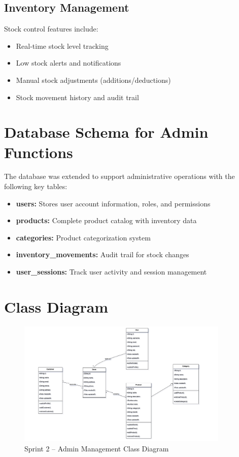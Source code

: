 \subsection*{Inventory Management}

Stock control features include:
\begin{itemize}
  \item Real-time stock level tracking
  \item Low stock alerts and notifications
  \item Manual stock adjustments (additions/deductions)
  \item Stock movement history and audit trail
\end{itemize}

\section{Database Schema for Admin Functions}

The database was extended to support administrative operations with the following key tables:

\begin{itemize}
  \item \textbf{users:} Stores user account information, roles, and permissions
  \item \textbf{products:} Complete product catalog with inventory data
  \item \textbf{categories:} Product categorization system
  \item \textbf{inventory\_movements:} Audit trail for stock changes
  \item \textbf{user\_sessions:} Track user activity and session management
\end{itemize}

\section{Class Diagram}

\begin{figure}[H]
  \centering
  \includegraphics[width=0.9\textwidth]{figures/images/sprint2class.png}
  \caption{Sprint 2 – Admin Management Class Diagram}
  \label{fig:sprint2-class}
\end{figure}

